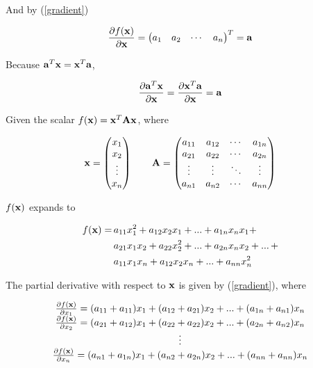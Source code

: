 \documentclass{article}
\newcommand{\vect}[1]{\textbf{\textrm{#1}}}
\newcommand{\pd}[2]{\frac{\partial {#1}}{\partial {#2}}}
\begin{document}
And by (\ref{gradient})

\begin{equation*}
	\pd{f(\vect{x})}{\vect{x}} = 
	\begin{pmatrix}
		a_1 & a_2 & \cdots & a_n
	\end{pmatrix}^{T} 
	= \vect{a}
\end{equation*}

Because $\vect{a}^{T}\vect{x} = \vect{x}^{T}\vect{a}$,

\begin{equation} \label{scalargradvv}
	\pd{\vect{a}^{T}\vect{x}}{\vect{x}} = \pd{\vect{x}^{T}\vect{a}}{\vect{x}} = \vect{a} \\[2em]
\end{equation} 

Given the scalar $f(\vect{x}) = \vect{x}^{T}\vect{A}\vect{x}$, where

\begin{equation*}
	\vect{x}= 
	\begin{pmatrix}
		x_1 \\ 
		x_2 \\ 
		\vdots \\ 
		x_n
	\end{pmatrix}
	\qquad \vect{A} = 
	\begin{pmatrix}
		a_{11} & a_{12} & \cdots & a_{1n} \\
		a_{21} & a_{22} & \cdots & a_{2n} \\
		\vdots & \vdots & \ddots & \vdots \\
		a_{n1} & a_{n2} & \cdots & a_{nn}
	\end{pmatrix}
\end{equation*}

$f(\vect{x})$ expands to

\begin{align*}
	f(\vect{x}) = \, & a_{11}x_1^2 + a_{12}x_2x_1 + ... + a_{1n}x_nx_1 + \\
				  & a_{21}x_1x_2 + a_{22}x_2^2 + ... + a_{2n}x_nx_2 + ... \, + \\
				  & a_{11}x_1x_n + a_{12}x_2x_n + ... + a_{nn}x_n^2
\end{align*}

The partial derivative with respect to $\vect{x}$ is given by (\ref{gradient}), where

\begin{equation*}
	\begin{matrix}
		\pd{f(\vect{x})}{x_1} = (a_{11} + a_{11})x_1 + (a_{12} + a_{21})x_2 + ... + 
							   	(a_{1n} + a_{n1})x_n \\
		\pd{f(\vect{x})}{x_2} = (a_{21} + a_{12})x_1 + (a_{22} + a_{22})x_2 + ... + 
							   	(a_{2n} + a_{n2})x_n \\
		\vdots \\
		\pd{f(\vect{x})}{x_n} = (a_{n1} + a_{1n})x_1 + (a_{n2} + a_{2n})x_2 + ... + 
							   	(a_{nn} + a_{nn})x_n 
	\end{matrix}
\end{equation*}
\end{document}
